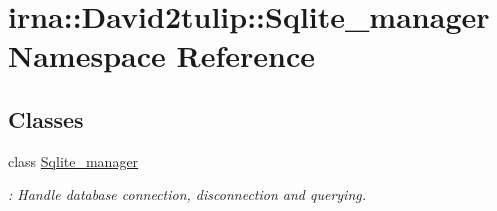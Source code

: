 \hypertarget{namespaceirna_1_1David2tulip_1_1Sqlite__manager}{
\section{irna\-:\-:\-David2tulip\-:\-:\-Sqlite\-\_\-manager \-Namespace \-Reference}
\label{namespaceirna_1_1David2tulip_1_1Sqlite__manager}
}
\subsection*{\-Classes}
\begin{DoxyCompactItemize}
\item 
class \hyperlink{classirna_1_1David2tulip_1_1Sqlite__manager_1_1Sqlite__manager}{\-Sqlite\-\_\-manager}
\begin{DoxyCompactList}\small\item\em \-: \-Handle database connection, disconnection and querying. \end{DoxyCompactList}\end{DoxyCompactItemize}
